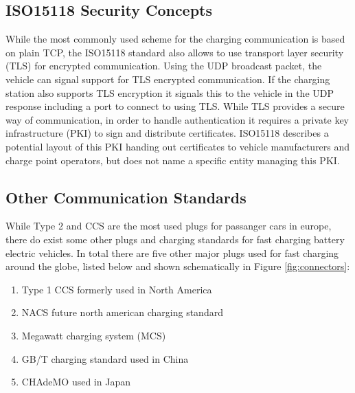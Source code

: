 \documentclass[conference,flushend]{iaria} %
\begin{document}

\subsection{ISO15118 Security Concepts} \label{sec:iso15118tls}
While the most commonly used scheme for the charging communication is based on plain TCP, the ISO15118 standard also allows to use transport layer security (TLS) for encrypted communication.
Using the UDP broadcast packet, the vehicle can signal support for TLS encrypted communication.
If the charging station also supports TLS encryption it signals this to the vehicle in the UDP response including a port to connect to using TLS.
While TLS provides a secure way of communication, in order to handle authentication it requires a private key infrastructure (PKI) to sign and distribute certificates.
ISO15118 describes a potential layout of this PKI handing out certificates to vehicle manufacturers and charge point operators, but does not name a specific entity managing this PKI.



\subsection{Other Communication Standards}
While Type 2 and CCS are the most used plugs for passanger cars in europe, there do exist some other plugs and charging standards for fast charging battery electric vehicles.
In total there are five other major plugs used for fast charging around the globe, listed below and shown schematically in Figure \ref{fig:connectors}:

\begin{enumerate}
\item Type 1 CCS formerly used in North America
\item NACS future north american charging standard
\item Megawatt charging system (MCS)
\item GB/T charging standard used in China
\item CHAdeMO used in Japan
\end{enumerate}
\end{document}
